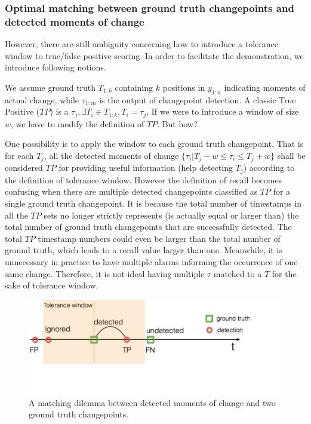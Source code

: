 \subsubsection{Optimal matching between ground truth changepoints and detected moments of change}
However, there are still ambiguity concerning how to introduce a tolerance window to true/false positive scoring.
In order to facilitate the demonstration, we introduce following notions.

We assume ground truth $T_{1:k}$ containing $k$ positions in $y_{1:n}$ indicating moments of actual change, while $\tau_{1:m}$ is the output of changepoint detection.
A classic True Positive ($TP$) is a $\tau_j, \exists T_i \in T_{1:k}, T_i = \tau_j$.
If we were to introduce a window of size $w$, we have to modify the definition of $TP$. But how?

One possibility is to apply the window to each ground truth changepoint.
That is for each $T_j$, all the detected moments of change $\{\tau_i | T_j - w \leq \tau_i \leq T_j + w \}$ shall be considered $TP$ for providing useful information (help detecting $T_j$) according to the definition of tolerance window.
However the definition of recall becomes confusing when there are multiple detected changepoints classified as $TP$ for a single ground truth changepoint.
It is because the total number of timestamps in all the $TP$ sets no longer strictly represents (is actually equal or larger than) the total number of ground truth changepoints that are successfully detected.
The total $TP$ timestamp numbers could even be larger than the total number of ground truth, which leads to a recall value larger than one.
Meanwhile, it is unnecessary in practice to have multiple alarms informing the occurrence of one same change.
Therefore, it is not ideal having multiple $\tau$ matched to a $T$ for the sake of tolerance window.

\begin{figure}[!htb]
\centering
\includegraphics[width=.95\textwidth]{gfx/chap4/matching_dilemma.pdf}
\caption{A matching dilemma between detected moments of change and two ground truth changepoints.}
\label{fig:matching_dilemma}
\end{figure}


